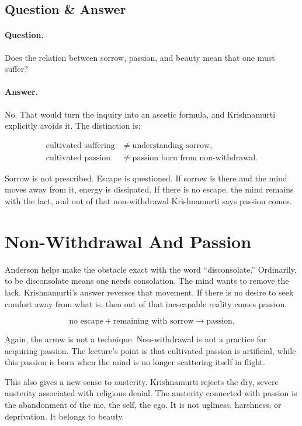 \documentclass[11pt,oneside]{book}
\begin{document}
\subsection{Question \& Answer}

\paragraph{Question.}
Does the relation between sorrow, passion, and beauty mean that one must suffer?

\paragraph{Answer.}
No. That would turn the inquiry into an ascetic formula, and Krishnamurti explicitly avoids it. The distinction is:

\begin{align}
\text{cultivated suffering} &\neq \text{understanding sorrow},\\
\text{cultivated passion} &\neq \text{passion born from non-withdrawal}.
\end{align}

Sorrow is not prescribed. Escape is questioned. If sorrow is there and the mind moves away from it, energy is dissipated. If there is no escape, the mind remains with the fact, and out of that non-withdrawal Krishnamurti says passion comes.

\section{Non-Withdrawal And Passion}

Anderson helps make the obstacle exact with the word ``disconsolate.'' Ordinarily, to be disconsolate means one needs consolation. The mind wants to remove the lack. Krishnamurti's answer reverses that movement. If there is no desire to seek comfort away from what is, then out of that inescapable reality comes passion.

\begin{equation}
\text{no escape}
+
\text{remaining with sorrow}
\longrightarrow
\text{passion}.
\end{equation}

Again, the arrow is not a technique. Non-withdrawal is not a practice for acquiring passion. The lecture's point is that cultivated passion is artificial, while this passion is born when the mind is no longer scattering itself in flight.

This also gives a new sense to austerity. Krishnamurti rejects the dry, severe austerity associated with religious denial. The austerity connected with passion is the abandonment of the me, the self, the ego. It is not ugliness, harshness, or deprivation. It belongs to beauty.
\end{document}
